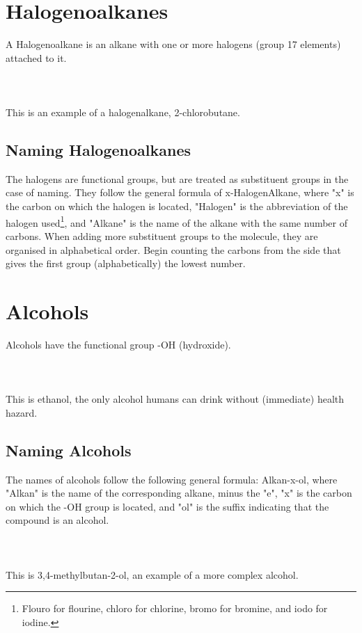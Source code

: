 \documentclass[11pt,twoside]{article}
\begin{document}
	\tableofcontents
	
	\section{Halogenoalkanes}
		A Halogenoalkane is an alkane with one or more halogens (group 17 elements) attached to it.
		\\ \\
		\\ \\
		This is an example of a halogenalkane, 2-chlorobutane.
		
		\subsection{Naming Halogenoalkanes}
			The halogens are functional groups, but are treated as substituent groups in the case of naming. They follow the general formula of x-HalogenAlkane, where "x" is the carbon on which the halogen is located, "Halogen" is the abbreviation of the halogen used\footnote{Flouro for flourine, chloro for chlorine, bromo for bromine, and iodo for iodine.}, and "Alkane" is the name of the alkane with the same number of carbons. When adding more substituent groups to the molecule, they are organised in alphabetical order. Begin counting the carbons from the side that gives the first group (alphabetically) the lowest number.
			
	\section{Alcohols}
		Alcohols have the functional group -OH (hydroxide).
		\\ \\
		\\ \\
		This is ethanol, the only alcohol humans can drink without (immediate) health hazard.
		\subsection{Naming Alcohols}
			The names of alcohols follow the following general formula: Alkan-x-ol, where "Alkan" is the name of the corresponding alkane, minus the "e", "x" is the carbon on which the -OH group is located, and "ol" is the suffix indicating that the compound is an alcohol.
			\\ \\
			\\ \\
			This is 3,4-methylbutan-2-ol, an example of a more complex alcohol.
\end{document}
